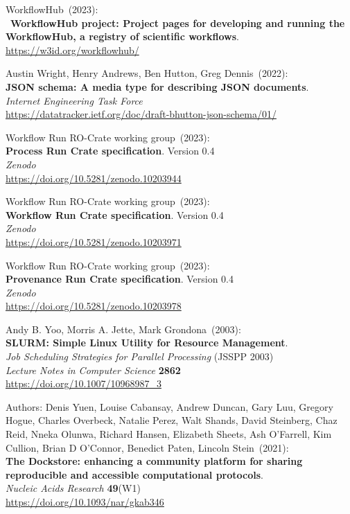 \begin{thebibliography}{9}
WorkflowHub~(2023): \\
~\textbf{WorkflowHub project: Project pages for developing and
running the WorkflowHub, a registry of scientific workflows}.\\
\url{https://w3id.org/workflowhub/}

Austin Wright, Henry Andrews, Ben Hutton, Greg Dennis~(2022): \\
\textbf{JSON schema: A media type for describing JSON documents}.\\
\emph{Internet Engineering Task Force}\\
\url{https://datatracker.ietf.org/doc/draft-bhutton-json-schema/01/}

Workflow Run RO-Crate working group~(2023): \\
\textbf{Process Run Crate specification}. Version 0.4\\
\emph{Zenodo}\\
\url{https://doi.org/10.5281/zenodo.10203944}

Workflow Run RO-Crate working group~(2023): \\
\textbf{Workflow Run Crate specification}. Version 0.4\\
\emph{Zenodo}\\
\url{https://doi.org/10.5281/zenodo.10203971}

Workflow Run RO-Crate
working group~(2023): \\
\textbf{Provenance Run Crate specification}. Version 0.4\\
\emph{Zenodo}\\
\url{https://doi.org/10.5281/zenodo.10203978}

Andy B. Yoo, Morris A. Jette, Mark Grondona~(2003): \\
\textbf{SLURM: Simple Linux Utility for Resource Management}.\\
\emph{Job Scheduling Strategies for Parallel Processing} (JSSPP 2003)\\
\emph{Lecture Notes in Computer Science} \textbf{2862}\\
\url{https://doi.org/10.1007/10968987_3}

Authors: Denis Yuen, Louise Cabansay, Andrew Duncan, Gary Luu, Gregory Hogue, Charles Overbeck, Natalie Perez, Walt Shands, David Steinberg, Chaz Reid, Nneka Olunwa, Richard Hansen, Elizabeth Sheets, Ash O’Farrell, Kim Cullion, Brian D O’Connor, Benedict Paten, Lincoln Stein~(2021): \\
\textbf{The Dockstore: enhancing a community platform for sharing reproducible and accessible computational protocols}.\\
\emph{Nucleic Acids Research} \textbf{49}(W1) \\
\url{https://doi.org/10.1093/nar/gkab346}


\end{thebibliography}
